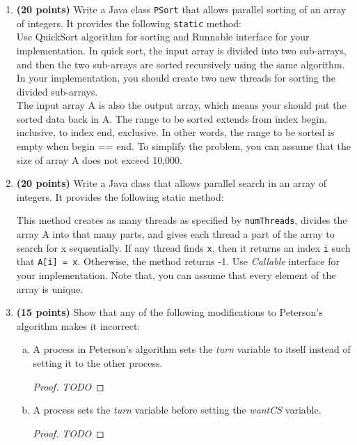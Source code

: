 \documentclass[11pt]{article}
\newcommand{\todo}{{\LARGE \emph{\color{red}TODO}}}
\newcounter{problem}
\begin{document}
\begin{enumerate}
\item \textbf{(20 points)} Write a Java class \texttt{PSort} that allows
  parallel sorting of an array of integers. It provides the following
  \texttt{static} method: \\



  Use QuickSort algorithm for sorting and Runnable interface for your
  implementation. In quick sort, the input array is divided into two sub-arrays,
  and then the two sub-arrays are sorted recursively using the same
  algorithm. In your implementation, you should create two new threads for
  sorting the divided
  sub-arrays. \\

  The input array A is also the output array, which means your should put the
  sorted data back in A.  The range to be sorted extends from index begin,
  inclusive, to index end, exclusive. In other words, the range to be sorted is
  empty when begin == end. To simplify the problem, you can assume that the size
  of array A does not exceed 10,000.

\item \textbf{(20 points)} Write a Java class that allows parallel search in an
  array of integers. It provides the following static method:



  This method creates as many threads as specified by \texttt{numThreads},
  divides the array A into that many parts, and gives each thread a part of the
  array to search for x sequentially. If any thread finds \texttt{x}, then it
  returns an index \texttt{i} such that \texttt{A[i] = x}. Otherwise, the method
  returns -1. Use \emph{Callable} interface for your implementation. Note that,
  you can assume that every element of the array is unique.

\item \textbf{(15 points)} Show that any of the following modifications to
  Peterson’s algorithm makes it incorrect:
  \begin{enumerate}[a)]
  \item A process in Peterson’s algorithm sets the \emph{turn} variable to
    itself instead of setting it to the other process.
    \begin{proof}
    	\todo
    \end{proof}
  \item A process sets the \emph{turn} variable before setting the \emph{wantCS}
    variable.
        \begin{proof}
    	\todo
    \end{proof}
  \end{enumerate}


\end{enumerate}
\end{document}
